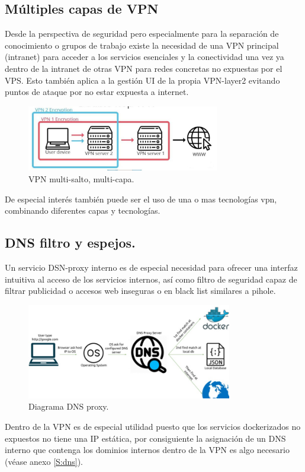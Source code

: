 \subsection{ Múltiples capas de VPN}\label{S:doble_layer}
Desde la perspectiva de seguridad pero especialmente para la separación de conocimiento o grupos de trabajo existe la necesidad de una VPN principal (intranet) para acceder a los servicios esenciales y la conectividad una vez ya dentro de la intranet de otras VPN para redes concretas no expuestas por el VPS. Esto también aplica a la gestión UI de la propia VPN-layer2 evitando puntos de ataque por no estar expuesta a internet.

\begin{figure}[!htb]
\begin{center}
\includegraphics[width=0.75\textwidth]{./figuras/vpn_ultiples_layers}
\caption{VPN multi-salto, multi-capa.}
\label{F:vpn_ultiples_layers}
\end{center}
\end{figure}

De especial interés también puede ser el uso de una o mas tecnologías vpn, combinando diferentes capas y tecnologías.

\subsection{DNS filtro y espejos.}

Un servicio DSN-proxy interno es de especial necesidad para ofrecer una interfaz intuitiva al acceso de los servicios internos, así como filtro de seguridad capaz de filtrar publicidad o accesos web inseguras o en black list similares a pihole\cite{c_pi_hole}.
\begin{figure}[!htb]
\begin{center}
\includegraphics[width=0.8\textwidth]{./figuras/dns-proxy.jpg}
\caption{Diagrama DNS proxy\cite{i_dns}.}
\label{F:dns_proxy}
\end{center}
\end{figure}
Dentro de la VPN es de especial utilidad puesto que los servicios dockerizados no expuestos no tiene una IP estática, por consiguiente la asignación de un DNS interno que contenga los dominios internos dentro de la VPN es algo necesario (véase anexo \ref{S:dns}).

